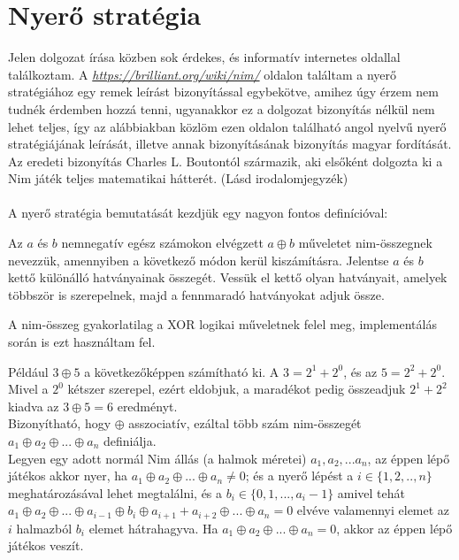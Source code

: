 \section{Nyerő stratégia}
Jelen dolgozat írása közben sok érdekes, és informatív internetes oldallal találkoztam. A {\em \url{ https://brilliant.org/wiki/nim/}} oldalon találtam a nyerő stratégiához egy remek leírást bizonyítással egybekötve, amihez úgy érzem nem tudnék érdemben hozzá tenni, ugyanakkor ez a dolgozat bizonyítás nélkül nem lehet teljes, így az alábbiakban közlöm ezen oldalon található angol nyelvű nyerő stratégiájának leírását, illetve annak bizonyításának bizonyítás magyar fordítását. Az eredeti bizonyítás Charles L. Boutontól származik, aki elsőként dolgozta ki a Nim játék teljes matematikai hátterét. (Lásd irodalomjegyzék) \\ \\

A nyerő stratégia bemutatását kezdjük egy nagyon fontos definícióval:
\begin{definition}
	Az $a$ és $b$ nemnegatív egész számokon elvégzett $a \oplus b$ műveletet nim-összegnek nevezzük, amennyiben a következő módon kerül kiszámításra. Jelentse $a$ és $b$ kettő különálló hatványainak összegét. Vessük el kettő olyan hatványait, amelyek többször is szerepelnek, majd a fennmaradó hatványokat adjuk össze.
\end{definition}

\begin{remark}
	A nim-összeg gyakorlatilag a XOR logikai műveletnek felel meg, implementálás során is ezt használtam fel.
\end{remark}

Például $3 \oplus 5$ a következőképpen számítható ki. A $3 = 2^1 + 2^0$, és az $5 = 2^2 + 2^0$. Mivel a $2^0$ kétszer szerepel, ezért eldobjuk, a maradékot pedig  összeadjuk $2^1 + 2^2$ kiadva az $3 \oplus 5 = 6$ eredményt. \\

Bizonyítható, hogy $\oplus$ asszociatív, ezáltal több szám nim-összegét $a_1 \oplus a_2 \oplus ... \oplus a_n$ definiálja. \\

Legyen egy adott normál Nim állás (a halmok méretei) $a_1, a_2, ... a_n$, az éppen lépő játékos akkor nyer, ha $a_1 \oplus a_2 \oplus ... \oplus a_n \neq 0$; és a nyerő lépést a $i \in \{1, 2, .., n\}$ meghatározásával lehet megtalálni, és a $b_i \in \{0, 1, ..., a_i -1\}$ amivel tehát $a_1 \oplus a_2 \oplus ... \oplus a_{i-1} \oplus b_i \oplus a_{i+1} + a_{i+2} \oplus ... \oplus a_n = 0$ elvéve valamennyi elemet az $i$ halmazból $b_i$ elemet hátrahagyva. Ha $a_1 \oplus a_2 \oplus ... \oplus a_n = 0$, akkor az éppen lépő játékos veszít. \\

